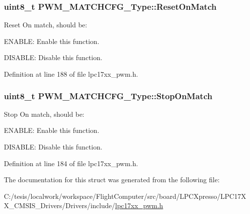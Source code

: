 \hypertarget{struct_p_w_m___m_a_t_c_h_c_f_g___type_a89909deab94be96d4d01cac6082eb1f5}{
\subsubsection[{\-Reset\-On\-Match}]{\setlength{\rightskip}{0pt plus 5cm}uint8\-\_\-t {\bf \-P\-W\-M\-\_\-\-M\-A\-T\-C\-H\-C\-F\-G\-\_\-\-Type\-::\-Reset\-On\-Match}}}\label{struct_p_w_m___m_a_t_c_h_c_f_g___type_a89909deab94be96d4d01cac6082eb1f5}
\-Reset \-On match, should be\-:
\begin{DoxyItemize}
\item \-E\-N\-A\-B\-L\-E\-: \-Enable this function.
\item \-D\-I\-S\-A\-B\-L\-E\-: \-Disable this function. 
\end{DoxyItemize}

\-Definition at line 188 of file lpc17xx\-\_\-pwm.\-h.

\hypertarget{struct_p_w_m___m_a_t_c_h_c_f_g___type_a632d2a5dcad18e5eef27e0bfa955064b}{
\subsubsection[{\-Stop\-On\-Match}]{\setlength{\rightskip}{0pt plus 5cm}uint8\-\_\-t {\bf \-P\-W\-M\-\_\-\-M\-A\-T\-C\-H\-C\-F\-G\-\_\-\-Type\-::\-Stop\-On\-Match}}}\label{struct_p_w_m___m_a_t_c_h_c_f_g___type_a632d2a5dcad18e5eef27e0bfa955064b}
\-Stop \-On match, should be\-:
\begin{DoxyItemize}
\item \-E\-N\-A\-B\-L\-E\-: \-Enable this function.
\item \-D\-I\-S\-A\-B\-L\-E\-: \-Disable this function. 
\end{DoxyItemize}

\-Definition at line 184 of file lpc17xx\-\_\-pwm.\-h.



\-The documentation for this struct was generated from the following file\-:\begin{DoxyCompactItemize}
\item 
\-C\-:/tesis/localwork/workspace/\-Flight\-Computer/src/board/\-L\-P\-C\-Xpresso/\-L\-P\-C17\-X\-X\-\_\-\-C\-M\-S\-I\-S\-\_\-\-Drivers/\-Drivers/include/\hyperlink{lpc17xx__pwm_8h}{lpc17xx\-\_\-pwm.\-h}\end{DoxyCompactItemize}
